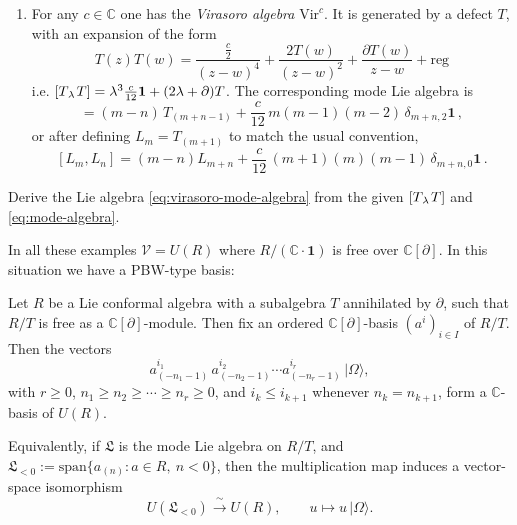 \documentclass[12pt,letterpaper,reqno]{amsart}
\numberwithin{equation}{section}
\newcommand{\Vir}{{\mathrm{Vir}}}
\newcommand{\bbC}{\ensuremath{\mathbb C}}
\newcommand{\regular}{{\mathrm{reg}}}
\newcommand{\lb}[3]{\left[#1_{\mkern2mu #2 \mkern2mu} #3\right]}
\newcommand\bid{{\mathbf 1}}
\newcommand\vac{{|\Omega\rangle}}
\newcommand{\vertex}{\mathcal{V}}
\newcommand{\ti}[1]{\textit{#1}}
\begin{document}
\begin{enumerate}
\item For any $c \in \bbC$ one has the \ti{Virasoro algebra} $\Vir^c$. It is generated by a defect $T$, with an expansion of the form
\begin{equation} \label{eq:virasoro-ope}
  T(z) T(w) = \frac{\frac{c}{2}}{(z-w)^4} + \frac{2 T(w)}{(z-w)^2} + \frac{\partial T(w)}{z-w} + \regular
\end{equation}
i.e. $\lb{T}{\lambda}{T} = \lambda^3 \frac{c}{12} \bid + (2 \lambda + \partial) T$.
The corresponding mode Lie algebra is
\begin{equation}
[T_{(m)},T_{(n)}]
=(m-n)\,T_{(m+n-1)}+\frac{c}{12}\,m(m-1)(m-2)\,\delta_{m+n,2} \bid \, ,
\end{equation}
or after defining $L_m = T_{(m+1)}$ to match the usual convention,
\begin{equation}  \label{eq:virasoro-mode-algebra}
  [L_m, L_n] = (m-n) L_{m+n} + \frac{c}{12}\,(m+1)(m)(m-1)\,\delta_{m+n,0} \bid \, .
\end{equation}

\end{enumerate}

\begin{exercise}
Derive the Lie algebra \eqref{eq:virasoro-mode-algebra}
from the given $\lb{T}{\lambda}{T}$ and \eqref{eq:mode-algebra}.
\end{exercise}

In all these examples $\vertex = U(R)$ where
$R / (\bbC \cdot \bid)$ is free over $\bbC[\partial]$.
In this situation we have a PBW-type basis:

\begin{prop}
Let $R$ be a Lie conformal algebra with a subalgebra $T$ annihilated by $\partial$,
such that $R/T$ is free as a $\bbC[\partial]$-module. Then fix an
ordered $\bbC[\partial]$-basis $(a^i)_{i\in I}$ of $R/T$.
Then the vectors
\[
a^{i_1}_{(-n_1-1)}\,a^{i_2}_{(-n_2-1)}\cdots a^{i_r}_{(-n_r-1)}\,\vac,
\]
with $r\ge 0$, $n_1\ge n_2\ge \cdots \ge n_r\ge 0$, and
$i_k\le i_{k+1}$ whenever $n_k=n_{k+1}$, form a $\bbC$-basis of $U(R)$.

Equivalently, if $\mathfrak L$ is the mode Lie algebra on $R/T$, and
$\mathfrak L_{<0}:=\mathrm{span}\{a_{(n)}:a\in R,\ n<0\}$, then the multiplication map
induces a vector-space isomorphism
\[
U(\mathfrak L_{<0}) \xrightarrow{\ \sim\ } U(R),\qquad u\mapsto u\,\vac.
\]

\end{prop}
\end{document}
